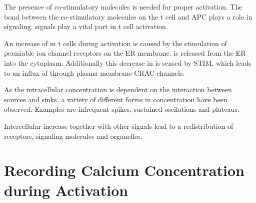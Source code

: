 The presence of co-stimulatory molecules is needed for proper activation. The bond between the co-stimulatory molecules on the t cell and APC plays a role in signaling. \Calcium signals play a vital part in t cell activation.

An increase of \Calcium in t cells during activation is caused by the stimulation of \Calcium permiable ion channel receptors on the ER membrane. \Calcium is released from the ER into the cytoplasm. Additionally this decrease in \Calcium is sensed by STIM, which leads to an influx of \Calcium through plasma membrane CRAC channels.\cite{smith2009}

As the intracellular \Calcium concentration is dependent on the interaction between \Calcium sources and sinks, a variety of different forms in \Calcium concentration have been observed. Examples are infrequent spikes, sustained oscilations and plateaus.\cite{Lewis2001}

Intercellular \Calcium increase together with other signals lead to a redistribution of receptors, signaling molecules and organelles.\cite{joseph2014}

\section{Recording Calcium Concentration during Activation}